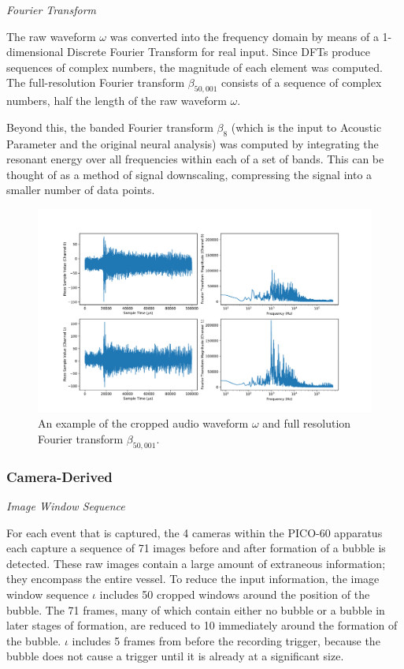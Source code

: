 \documentclass[10pt]{article}
\begin{document}
\textit{Fourier Transform}

The raw waveform $\omega$ was converted into the frequency domain by means of a 1-dimensional Discrete Fourier Transform for real input. Since DFTs produce sequences of complex numbers, the magnitude of each element was computed. The full-resolution Fourier transform $\beta _{50,001}$ consists of a sequence of complex numbers, half the length of the raw waveform $\omega$.

Beyond this, the banded Fourier transform $\beta_{8}$ (which is the input to Acoustic Parameter and the original neural analysis) was computed by integrating the resonant energy over all frequencies within each of a set of bands. This can be thought of as a method of signal downscaling, compressing the signal into a smaller number of data points.

\begin{figure}[h]
    \centering
    \includegraphics[width=\textwidth]{audio}
    \caption{\label{} An example of the cropped audio waveform $\omega$ and full resolution Fourier transform $\beta_{50,001}$.}
\end{figure}

\subsubsection{Camera-Derived}

\textit{Image Window Sequence}

For each event that is captured, the 4 cameras within the PICO-60 apparatus each capture a sequence of 71 images before and after formation of a bubble is detected. These raw images contain a large amount of extraneous information; they encompass the entire vessel. To reduce the input information, the image window sequence $\iota$ includes 50 cropped windows around the position of the bubble. The 71 frames, many of which contain either no bubble or a bubble in later stages of formation, are reduced to 10 immediately around the formation of the bubble. $\iota$ includes 5 frames from before the recording trigger, because the bubble does not cause a trigger until it is already at a significant size.
\end{document}
